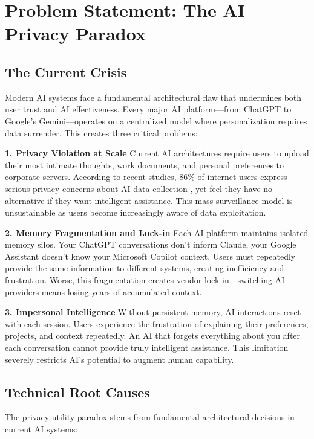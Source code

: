 \documentclass[12pt, a4paper]{article}
\begin{document}
\section{Problem Statement: The AI Privacy Paradox}

\subsection{The Current Crisis}

Modern AI systems face a fundamental architectural flaw that undermines both user trust and AI effectiveness. Every major AI platform—from ChatGPT to Google's Gemini—operates on a centralized model where personalization requires data surrender. This creates three critical problems:

\textbf{1. Privacy Violation at Scale}
Current AI architectures require users to upload their most intimate thoughts, work documents, and personal preferences to corporate servers. According to recent studies, 86\% of internet users express serious privacy concerns about AI data collection \cite{kpmg2021}, yet feel they have no alternative if they want intelligent assistance. This mass surveillance model is unsustainable as users become increasingly aware of data exploitation.

\textbf{2. Memory Fragmentation and Lock-in}
Each AI platform maintains isolated memory silos. Your ChatGPT conversations don't inform Claude, your Google Assistant doesn't know your Microsoft Copilot context. Users must repeatedly provide the same information to different systems, creating inefficiency and frustration. Worse, this fragmentation creates vendor lock-in—switching AI providers means losing years of accumulated context.

\textbf{3. Impersonal Intelligence}
Without persistent memory, AI interactions reset with each session. Users experience the frustration of explaining their preferences, projects, and context repeatedly. An AI that forgets everything about you after each conversation cannot provide truly intelligent assistance. This limitation severely restricts AI's potential to augment human capability.

\subsection{Technical Root Causes}

The privacy-utility paradox stems from fundamental architectural decisions in current AI systems:
\end{document}
